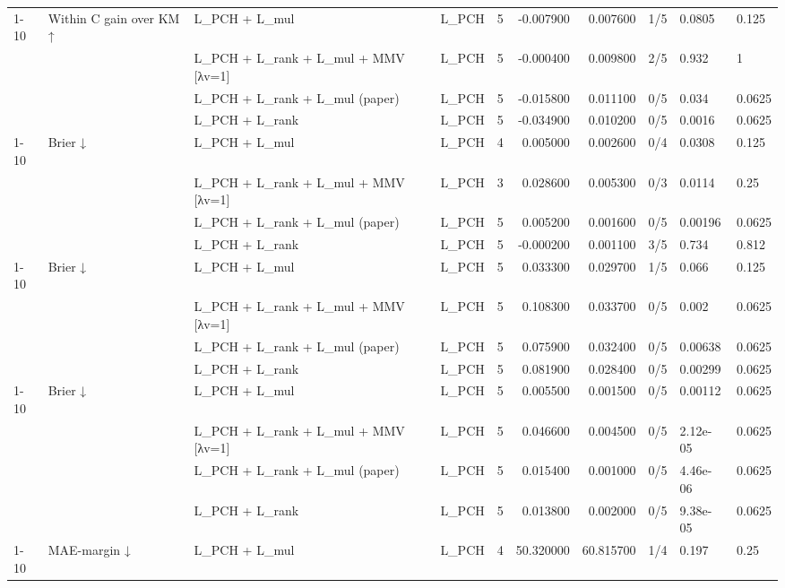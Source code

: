 \begin{tabular}{llllrrrlll}
\cline{1-10} \cline{2-10}
\multirow[t]{4}{*}{sim\_base} & \multirow[t]{4}{*}{Within C gain over KM ↑} & L\_PCH + L\_mul & L\_PCH & 5 & -0.007900 & 0.007600 & 1/5 & 0.0805 & 0.125 \\
 &  & L\_PCH + L\_rank + L\_mul + MMV [λv=1] & L\_PCH & 5 & -0.000400 & 0.009800 & 2/5 & 0.932 & 1 \\
 &  & L\_PCH + L\_rank + L\_mul (paper) & L\_PCH & 5 & -0.015800 & 0.011100 & 0/5 & 0.034 & 0.0625 \\
 &  & L\_PCH + L\_rank & L\_PCH & 5 & -0.034900 & 0.010200 & 0/5 & 0.0016 & 0.0625 \\
\cline{1-10} \cline{2-10}
\multirow[t]{4}{*}{ebmt} & \multirow[t]{4}{*}{Brier ↓} & L\_PCH + L\_mul & L\_PCH & 4 & 0.005000 & 0.002600 & 0/4 & 0.0308 & 0.125 \\
 &  & L\_PCH + L\_rank + L\_mul + MMV [λv=1] & L\_PCH & 3 & 0.028600 & 0.005300 & 0/3 & 0.0114 & 0.25 \\
 &  & L\_PCH + L\_rank + L\_mul (paper) & L\_PCH & 5 & 0.005200 & 0.001600 & 0/5 & 0.00196 & 0.0625 \\
 &  & L\_PCH + L\_rank & L\_PCH & 5 & -0.000200 & 0.001100 & 3/5 & 0.734 & 0.812 \\
\cline{1-10} \cline{2-10}
\multirow[t]{4}{*}{hsa\_synthetic} & \multirow[t]{4}{*}{Brier ↓} & L\_PCH + L\_mul & L\_PCH & 5 & 0.033300 & 0.029700 & 1/5 & 0.066 & 0.125 \\
 &  & L\_PCH + L\_rank + L\_mul + MMV [λv=1] & L\_PCH & 5 & 0.108300 & 0.033700 & 0/5 & 0.002 & 0.0625 \\
 &  & L\_PCH + L\_rank + L\_mul (paper) & L\_PCH & 5 & 0.075900 & 0.032400 & 0/5 & 0.00638 & 0.0625 \\
 &  & L\_PCH + L\_rank & L\_PCH & 5 & 0.081900 & 0.028400 & 0/5 & 0.00299 & 0.0625 \\
\cline{1-10} \cline{2-10}
\multirow[t]{4}{*}{sim\_base} & \multirow[t]{4}{*}{Brier ↓} & L\_PCH + L\_mul & L\_PCH & 5 & 0.005500 & 0.001500 & 0/5 & 0.00112 & 0.0625 \\
 &  & L\_PCH + L\_rank + L\_mul + MMV [λv=1] & L\_PCH & 5 & 0.046600 & 0.004500 & 0/5 & 2.12e-05 & 0.0625 \\
 &  & L\_PCH + L\_rank + L\_mul (paper) & L\_PCH & 5 & 0.015400 & 0.001000 & 0/5 & 4.46e-06 & 0.0625 \\
 &  & L\_PCH + L\_rank & L\_PCH & 5 & 0.013800 & 0.002000 & 0/5 & 9.38e-05 & 0.0625 \\
\cline{1-10} \cline{2-10}
\multirow[t]{4}{*}{ebmt} & \multirow[t]{4}{*}{MAE-margin ↓} & L\_PCH + L\_mul & L\_PCH & 4 & 50.320000 & 60.815700 & 1/4 & 0.197 & 0.25 \\

\end{tabular}

